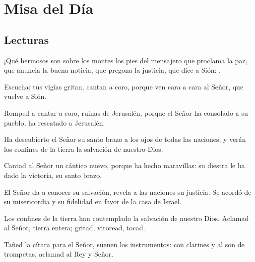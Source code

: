\chapter{Misa del Día}

\section{Lecturas}


 


\begin{scripture}
	\begin{readprose}
		¡Qué hermosos son sobre los montes
		los pies del mensajero que proclama la paz,
		que anuncia la buena noticia,
		que pregona la justicia,	
		que dice a Sión: .
		
		Escucha: tus vigías gritan, cantan a coro,	
		porque ven cara a cara al Señor,		
		que vuelve a Sión.
		
		Romped a cantar a coro,
		ruinas de Jerusalén,	
		porque el Señor ha consolado a su pueblo,	
		ha rescatado a Jerusalén.
				
		Ha descubierto el Señor su santo brazo
		a los ojos de todas las naciones,
		y verán los confines de la tierra
		la salvación de nuestro Dios.
	\end{readprose}
\end{scripture}


 


\begin{psbody}
	Cantad al Señor un cántico nuevo,
	porque ha hecho maravillas:
	su diestra le ha dado la victoria,
	su santo brazo.
	
	El Señor da a conocer su salvación,
	revela a las naciones su justicia.
	Se acordó de su misericordia y su fidelidad
	en favor de la casa de Israel.
	
	Los confines de la tierra han contemplado
	la salvación de nuestro Dios.
	Aclamad al Señor, tierra entera;
	gritad, vitoread, tocad.
	
	Tañed la cítara para el Señor,
	suenen los instrumentos:
	con clarines y al son de trompetas,
	aclamad al Rey y Señor.
\end{psbody}


